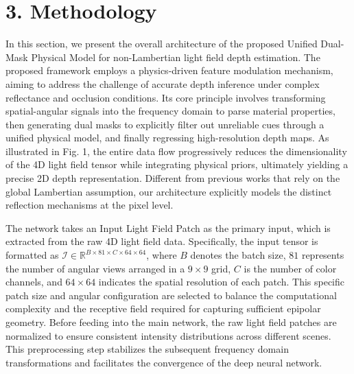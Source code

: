 \section{3. Methodology}

In this section, we present the overall architecture of the proposed Unified Dual-Mask Physical Model for non-Lambertian light field depth estimation. The proposed framework employs a physics-driven feature modulation mechanism, aiming to address the challenge of accurate depth inference under complex reflectance and occlusion conditions. Its core principle involves transforming spatial-angular signals into the frequency domain to parse material properties, then generating dual masks to explicitly filter out unreliable cues through a unified physical model, and finally regressing high-resolution depth maps. As illustrated in Fig. 1, the entire data flow progressively reduces the dimensionality of the 4D light field tensor while integrating physical priors, ultimately yielding a precise 2D depth representation. Different from previous works that rely on the global Lambertian assumption, our architecture explicitly models the distinct reflection mechanisms at the pixel level.

The network takes an Input Light Field Patch as the primary input, which is extracted from the raw 4D light field data. Specifically, the input tensor is formatted as $\mathcal{I} \in \mathbb{R}^{B \times 81 \times C \times 64 \times 64}$, where $B$ denotes the batch size, $81$ represents the number of angular views arranged in a $9 \times 9$ grid, $C$ is the number of color channels, and $64 \times 64$ indicates the spatial resolution of each patch. This specific patch size and angular configuration are selected to balance the computational complexity and the receptive field required for capturing sufficient epipolar geometry. Before feeding into the main network, the raw light field patches are normalized to ensure consistent intensity distributions across different scenes. This preprocessing step stabilizes the subsequent frequency domain transformations and facilitates the convergence of the deep neural network.


